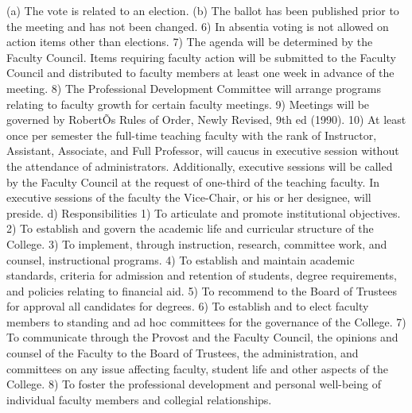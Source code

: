 \documentclass[letterpaper, 11pt]{article}
\begin{document}
				(a) The vote is related to an election.
				(b) The ballot has been published prior to the meeting and has not been changed.
				6) In absentia voting is not allowed on action items other than elections.
				7) The agenda will be determined by the Faculty Council.  Items requiring faculty action will be submitted to the Faculty Council and distributed to faculty members at least one week in advance of the meeting.
				8) The Professional Development Committee will arrange programs relating to faculty growth for certain faculty meetings.
				9) Meetings will be governed by RobertÕs Rules of Order, Newly Revised, 9th ed (1990).
				10) At least once per semester the full-time teaching faculty with the rank of Instructor, Assistant, Associate, and Full Professor, will caucus in executive session without the attendance of administrators.  Additionally, executive sessions will be called by the Faculty Council at the request of one-third of the teaching faculty.  In executive sessions of the faculty the Vice-Chair, or his or her designee, will preside.
				d) Responsibilities
				1) To articulate and promote institutional objectives.
				2) To establish and govern the academic life and curricular structure of the College.
				3) To implement, through instruction, research, committee work, and counsel, instructional programs.
				4) To establish and maintain academic standards, criteria for admission and retention of students, degree requirements, and policies relating to financial aid.
				5) To recommend to the Board of Trustees for approval all candidates for degrees.
				6) To establish and to elect faculty members to standing and ad hoc committees for the governance of the College.
				7) To communicate through the Provost and the Faculty Council, the opinions and counsel of the Faculty to the Board of Trustees, the administration, and committees on any issue affecting faculty, student life and other aspects of the College.
				8) To foster the professional development and personal well-being of individual faculty members and collegial relationships.
\end{document}
